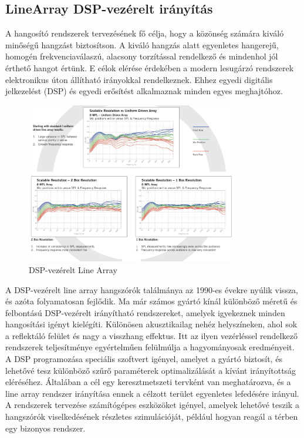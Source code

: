 \subsection{LineArray DSP-vezérelt irányítás}
A hangosító rendszerek tervezésének fő célja, hogy a közönség számára kiváló minőségű hangzást biztosítson. 
A kiváló hangzás alatt egyenletes hangerejű, homogén frekvenciaválaszú, alacsony torzítással rendelkező és mindenhol jól érthető hangot értünk. 
E célok elérése érdekében a modern lesugárzó rendszerek elektronikus úton állítható irányokkal rendelkeznek. 
Ehhez egyedi digitális jelkezelést (DSP) és egyedi erősítést alkalmaznak minden egyes meghajtóhoz.
\begin{figure}[H]
    \centering
    \includegraphics[width=350px, keepaspectratio]{figures/dsp_arrays.png}
    \caption{DSP-vezérelt Line Array~\cite{AHNERT2023}}
    \label{fig:dsp_arrays}
\end{figure}
A DSP-vezérelt line array hangszórók találmánya az 1990-es évekre nyúlik vissza, és azóta folyamatosan fejlődik.
Ma már számos gyártó kínál különböző méretű és felbontású DSP-vezérelt irányítható rendszereket, 
amelyek igyekeznek minden hangosítási igényt kielégíti. 
Különösen akusztikailag nehéz helyszíneken, ahol sok a reflektáló felület és nagy a visszhang effektus. 
Itt az ilyen vezérléssel rendelkező rendszerek teljesítménye egyértelműen felülmúlja a hagyományosak eredményeit. 
A DSP programozása speciális szoftvert igényel, amelyet a gyártó biztosít, és lehetővé tesz különböző szűrő paraméterek optimalizálását a kívánt irányítottság eléréséhez. 
Általában a cél egy keresztmetszeti tervként van meghatározva, és a line array rendszer irányítása ennek a célzott terület egyenletes lefedésére irányul.
A rendszerek tervezése számítógépes eszközöket igényel, amelyek lehetővé teszik a hangszórók viselkedésének részletes szimulációját, például hogyan reagál a térben egy bizonyos rendszer.

